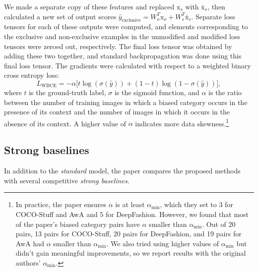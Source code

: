 We made a separate copy of these features and replaced $\mathrm{x}_s$ with $\bar{\mathrm{x}}_s$, then calculated a new set of output scores $\hat{y}_{\text{exclusive}} = W^T_o \mathrm{x}_o + W^T_s \bar{\mathrm{x}}_s$. Separate loss tensors for each of these outputs were computed, and elements corresponding to the exclusive and non-exclusive examples in the unmodified and modified loss tensors were zeroed out, respectively. The final loss tensor was obtained by adding these two together, and standard backpropagation was done using this final loss tensor. The gradients were calculated with respect to a weighted binary cross entropy loss:
\begin{equation}
    L_\text{WBCE} = - \alpha \big[t\log(\sigma(\hat{y})) + (1-t)\log(1-\sigma(\hat{y}))\big],
\end{equation}
where $t$ is the ground-truth label, $\sigma$ is the sigmoid function, and $\alpha$ is the ratio between the number of training images in which a biased category occurs in the presence of its context and the number of images in which it occurs in the absence of its context. A higher value of $\alpha$ indicates more data skewness.\footnote{In practice, the paper ensures $\alpha$ is at least $\alpha_{\text{min}}$, which they set to 3 for COCO-Stuff and AwA and 5 for DeepFashion. However, we found that most of the paper's biased category pairs have $\alpha$ smaller than $\alpha_{\text{min}}$. Out of 20 pairs, 13 pairs for COCO-Stuff, 20 pairs for DeepFashion, and 19 pairs for AwA had $\alpha$ smaller than $\alpha_{\text{min}}$. We also tried using higher values of $\alpha_{\text{min}}$ but didn't gain meaningful improvements, so we report results with the original authors' $\alpha_{\text{min}}$.}


\subsection{Strong baselines}
\label{sec:strong-baselines}

In addition to the \emph{standard} model, the paper compares the proposed methods with several competitive \textit{strong baselines}.

